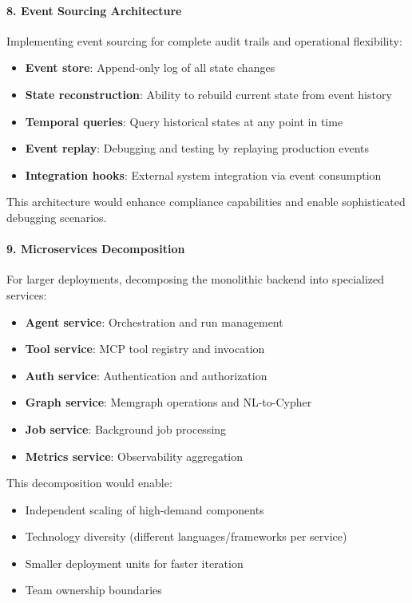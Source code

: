 \paragraph{8. Event Sourcing Architecture}

Implementing event sourcing for complete audit trails and operational flexibility:

\begin{itemize}
    \item \textbf{Event store}: Append-only log of all state changes
    \item \textbf{State reconstruction}: Ability to rebuild current state from event history
    \item \textbf{Temporal queries}: Query historical states at any point in time
    \item \textbf{Event replay}: Debugging and testing by replaying production events
    \item \textbf{Integration hooks}: External system integration via event consumption
\end{itemize}

This architecture would enhance compliance capabilities and enable sophisticated debugging scenarios.

\paragraph{9. Microservices Decomposition}

For larger deployments, decomposing the monolithic backend into specialized services:

\begin{itemize}
    \item \textbf{Agent service}: Orchestration and run management
    \item \textbf{Tool service}: MCP tool registry and invocation
    \item \textbf{Auth service}: Authentication and authorization
    \item \textbf{Graph service}: Memgraph operations and NL-to-Cypher
    \item \textbf{Job service}: Background job processing
    \item \textbf{Metrics service}: Observability aggregation
\end{itemize}

This decomposition would enable:
\begin{itemize}
    \item Independent scaling of high-demand components
    \item Technology diversity (different languages/frameworks per service)
    \item Smaller deployment units for faster iteration
    \item Team ownership boundaries
\end{itemize}

